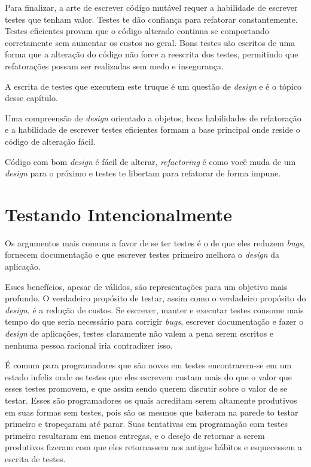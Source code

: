 Para finalizar, a arte de escrever código mutável requer a habilidade de escrever testes que tenham valor. Testes te dão confiança para refatorar constantemente. Testes eficientes provam que o código alterado continua se comportando corretamente sem aumentar os custos no geral. Bons testes são escritos de uma forma que a alteração do código não force a reescrita dos testes, permitindo que refatorações possam ser realizadas sem medo e insegurança.

A escrita de testes que executem este truque é um questão de \textit{design} e é o tópico desse capítulo.

Uma compreensão de \textit{design} orientado a objetos, boas habilidades de refatoração e a habilidade de escrever testes eficientes formam a base principal onde reside o código de alteração fácil.

Código com bom \textit{design} é fácil de alterar, \textit{refactoring} é como você muda de um \textit{design} para o próximo e testes te libertam para refatorar de forma impune.

\section{Testando Intencionalmente}

Os argumentos mais comuns a favor de se ter testes é o de que eles reduzem \textit{bugs}, fornecem documentação e que escrever testes primeiro melhora o \textit{design} da aplicação.

Esses benefícios, apesar de válidos, são representações para um objetivo mais profundo. O verdadeiro propósito de testar, assim como o verdadeiro propósito do \textit{design}, é a redução de custos. Se escrever, manter e executar testes consome mais tempo do que seria necessário para corrigir \textit{bugs}, escrever documentação e fazer o \textit{design} de aplicações, testes claramente não valem a pena serem escritos e nenhuma pessoa racional iria contradizer isso.

É comum para programadores que são novos em testes encontrarem-se em um estado infeliz onde os testes que eles escrevem custam mais do que o valor que esses testes promovem, e que assim sendo querem discutir sobre o valor de se testar. Esses são programadores os quais acreditam serem altamente produtivos em suas formas sem testes, pois são os mesmos que bateram na parede to testar primeiro e tropeçaram até parar. Suas tentativas em programação com testes primeiro resultaram em menos entregas, e o desejo de retornar a serem produtivos fizeram com que eles retornassem aos antigos hábitos e esquecessem a escrita de testes.

